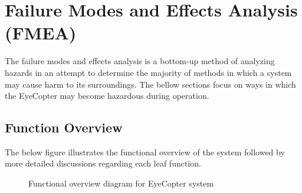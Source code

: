 \documentclass[10pt,letterpaper]{article}
\begin{document}
\newpage

\section{Failure Modes and Effects Analysis (FMEA)}
The failure modes and effects analysis is a bottom-up method of analyzing hazards in an attempt to determine the majority of methods in which a system may cause harm to its surroundings. The bellow sections focus on ways in which the EyeCopter may become hazardous during operation. 
\subsection{Function Overview}
The below figure illustrates the functional overview of the system followed by more detailed discussions regarding each leaf function.

\vspace{1cm}

\begin{figure}[h]
  \caption{Functional overview diagram for EyeCopter system}
  \label{fig:context_diagram}
\end{figure}

\newpage
\end{document}
